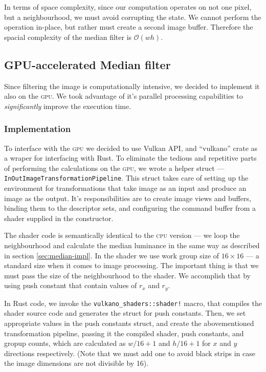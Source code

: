 \documentclass[12pt]{article}
\theoremstyle{definition}
\begin{document}
In terms of space complexity, since our computation operates on not one pixel, but a neighbourhood, we must avoid corrupting the state.
We cannot perform the operation in-place, but rather must create a second image buffer.
Therefore the spacial complexity of the median filter is $\mathcal{O}(wh)$.

\subsection{GPU-accelerated Median filter}

Since filtering the image is computationally intensive, we decided to implement it also on the \textsc{gpu}.
We took advantage of it's parallel processing capabilities to \emph{significantly} improve the execution time.

\subsubsection{Implementation}\label{sec:median-gpu-impl}

To interface with the \textsc{gpu} we decided to use Vulkan API,
and ``vulkano'' crate as a wraper for interfacing with Rust.
To eliminate the tedious and repetitive parts of performing the calculations on the \textsc{gpu},
we wrote a helper struct --- \lstinline{InOutImageTransformationPipeline}.
This struct takes care of setting up the environment for transformations that take image as an input and produce an image as the output.
It's responsibilities are to create image views and buffers, binding them to the descriptor sets, and configuring the command buffer from a shader supplied in the constructor.

The shader code is semantically identical to the \textsc{cpu} version ---
we loop the neighbourhood and calculate the median luminance in the same way as described in section \ref{sec:median-impl}.
In the shader we use work group size of $16\times16$ --- a standard size when it comes to image processing.
The important thing is that we must pass the size of the neighbourhood to the shader.
We accomplish that by using push constant that contain values of $r_x$ and $r_y$.

In Rust code, we invoke the \lstinline{vulkano_shaders::shader!} macro, that compiles the shader source code and generates the struct for push constants.
Then, we set appropriate values in the push constants struct, and create the abovementioned transformation pipeline,
passing it the compiled shader, push constants, and gropup counts, which are calculated as $w / 16 + 1$ and $h / 16 + 1$ for $x$ and $y$ directions respectively.
(Note that we must add one to avoid black strips in case the image dimensions are not divisible by 16).
\end{document}
